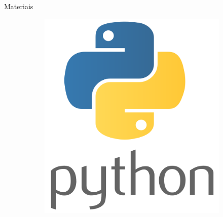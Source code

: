 
    \begin{frame}{Materiais}
       \begin{figure}[!ht]
        \centering %
          \begin{subfigure}[H]{0.3\textwidth}
            \includegraphics[width=\textwidth]{img/logo/Python.png}
            \label{fig_op_ag}
          \end{subfigure}
          \hspace*{0.80cm}
          \begin{subfigure}[H]{0.2\textwidth}

\end{subfigure}
\end{figure}
\end{frame}
